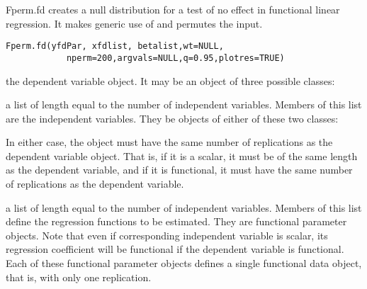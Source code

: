 \begin{Description}\relax
Fperm.fd creates a null distribution for a test of no effect in functional
linear regression. It makes generic use of  and permutes the
 input.
\end{Description}
\begin{Usage}
\begin{verbatim}
Fperm.fd(yfdPar, xfdlist, betalist,wt=NULL,
            nperm=200,argvals=NULL,q=0.95,plotres=TRUE)
\end{verbatim}
\end{Usage}
\begin{Arguments}
\begin{ldescription}
\item[\code{yfdPar}] the dependent variable object.  It may be an object of
three possible classes:

\item[\code{xfdlist}] a list of length equal to the number of independent variables. Members
of this list are the independent variables.  They be objects of either
of these two classes:


In either case, the object must have the same number of replications as
the dependent variable object.  That is, if it is a scalar, it must be
of the same length as the dependent variable, and if it is functional,
it must have the same number of replications as the dependent variable.

\item[\code{betalist}] a list of length equal to the number of independent variables. Members
of this list define the regression functions to be estimated.
They are functional parameter objects.  Note that even if corresponding
independent variable is scalar, its regression coefficient will be
functional if the dependent variable is functional.  Each of these
functional parameter objects defines a single functional data object,
that is, with only one replication.


\end{ldescription}
\end{Arguments}
